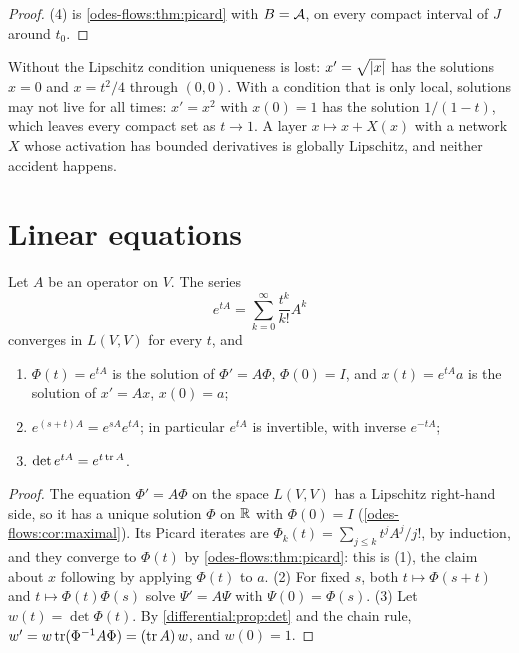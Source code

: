 \begin{notechapter}
\begin{proof}
(4) is \cref{odes-flows:thm:picard} with $B = \mathcal{A}$, on every compact
interval of $J$ around $t_0$.
\end{proof}

\begin{pitfall}
Without the Lipschitz condition uniqueness is lost: $x' = \sqrt{\left|x\right|}$
has the solutions $x = 0$ and $x = t^2/4$ through $(0, 0)$. With a
condition that is only local, solutions may not live for all times:
$x' = x^2$ with $x(0) = 1$ has the solution $1/(1 - t)$, which leaves
every compact set as $t\to1$. A layer $x\mapsto x + X(x)$ with a
network $X$ whose activation has bounded derivatives is globally
Lipschitz, and neither accident happens.
\end{pitfall}

\section{Linear equations}\label{odes-flows:sec:linear}

\begin{theorem}\label{odes-flows:thm:exp}
Let $A$ be an operator on $V$. The series
\[
  e^{tA} = \sum_{k=0}^\infty\frac{t^k}{k!}A^k
\]
converges in $L(V, V)$ for every $t$, and
\begin{enumerate}[nosep]
  \item $\Phi(t) = e^{tA}$ is the solution of $\Phi' = A\Phi$,
        $\Phi(0) = I$, and $x(t) = e^{tA}a$ is the solution of
        $x' = Ax$, $x(0) = a$;
  \item $e^{(s+t)A} = e^{sA}e^{tA}$; in particular $e^{tA}$ is
        invertible, with inverse $e^{-tA}$;
  \item $\det e^{tA} = e^{t\operatorname{tr} A}$.
\end{enumerate}
\end{theorem}

\begin{proof}
The equation $\Phi' = A\Phi$ on the space $L(V, V)$ has a Lipschitz
right-hand side, so it has a unique solution $\Phi$ on $\mathbb{R}$ with
$\Phi(0) = I$ (\cref{odes-flows:cor:maximal}). Its Picard iterates are
$\Phi_k(t) = \sum_{j\leq k}t^jA^j/j!$, by induction, and they converge
to $\Phi(t)$ by \cref{odes-flows:thm:picard}: this is (1), the claim
about $x$ following by applying $\Phi(t)$ to $a$. (2) For fixed $s$,
both $t\mapsto\Phi(s + t)$ and $t\mapsto\Phi(t)\Phi(s)$ solve
$\Psi' = A\Psi$ with $\Psi(0) = \Phi(s)$. (3) Let
$w(t) = \det\Phi(t)$. By \cref{differential:prop:det} and the chain
rule, $w' = w\operatorname{tr}(\Phi^{-1}A\Phi) = (\operatorname{tr} A)\,w$, and $w(0) = 1$.
\end{proof}


\end{notechapter}
